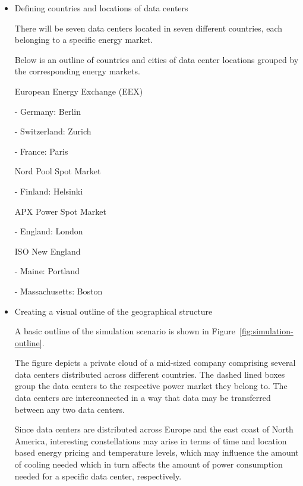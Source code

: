 \documentclass[a4paper]{article}
\begin{document}
\begin{itemize}

\item Defining countries and locations of data centers

There will be seven data centers located in seven different countries, each belonging to a specific energy market. 

Below is an outline of countries and cities of data center locations grouped by the corresponding energy markets. 

	\subitem European Energy Exchange (EEX) 
	
		\subsubitem - Germany: Berlin
		
		\subsubitem - Switzerland: Zurich
		
		\subsubitem - France: Paris
		
	\subitem Nord Pool Spot Market 
	
		\subsubitem - Finland: Helsinki
		
	\subitem APX Power Spot Market
	
		\subsubitem - England: London
		
	\subitem ISO New England
	
		\subsubitem - Maine: Portland
		
		\subsubitem - Massachusetts: Boston

\item Creating a visual outline of the geographical structure

A basic outline of the simulation scenario is shown in Figure~\ref{fig:simulation-outline}. 

The figure depicts a private cloud of a mid-sized company comprising several data centers distributed across different countries. 
The dashed lined boxes group the data centers to the respective power market they belong to. The data centers are interconnected in a way that data may be transferred between any two data centers. 

Since data centers are distributed across Europe and the east coast of North America, interesting constellations may arise in terms of time and location based energy pricing and temperature levels, which may influence the amount of cooling needed which in turn affects the amount of power consumption needed for a specific data center, respectively. 



\end{itemize}
\end{document}
